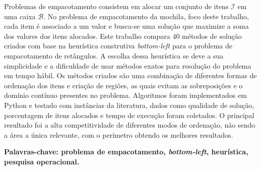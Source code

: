 
\begin{resumo}
    Problemas de empacotamento consistem em alocar um conjunto de itens $\mathcal{I}$ em uma
    caixa $\mathcal{B}$.
    No problema de empacotamento da mochila, foco deste trabalho, cada item é associado a um valor
    e busca-se uma solução que maximize a soma dos valores dos itens alocados.
    Este trabalho compara 40 métodos de solução criados com base na heurística construtiva
    \textit{bottom-left} para o problema de empacotamento de retângulos.
    A escolha dessa heurística se deve a sua simplicidade e a dificuldade de usar métodos exatos
    para resolução do problema em tempo hábil.
    Os métodos criados são uma combinação de diferentes formas de ordenação dos itens e criação
    de regiões, as quais evitam as sobreposições e o domínio contínuo presentes no problema.
    Algoritmos foram implementados em Python e testado com instâncias da literatura, dados como
    qualidade de solução, porcentagem de itens alocados e tempo de execução foram coletados.
    O principal resultado foi a alta competitividade de diferentes modos de ordenação,
    não sendo a área a única relevante, com o perímetro obtendo os melhores resultados.

    \textbf{Palavras-chave: problema de empacotamento, \textit{bottom-left}, heurística,
        pesquisa operacional.}
\end{resumo}
\newpage

